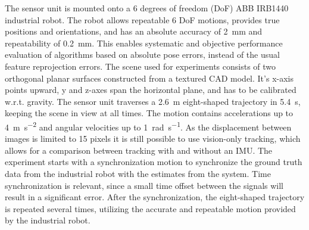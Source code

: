 The sensor unit is mounted onto a 6 degrees of freedom (DoF) ABB IRB1440 industrial robot. The robot allows repeatable 6 DoF motions, provides true positions and orientations, and has an absolute accuracy of \SI{2}{\mm} and repeatability of \SI{0.2}{\mm}. This enables systematic and objective performance evaluation of algorithms based on absolute pose errors, instead of the usual feature reprojection errors. The scene used for experiments consists of two orthogonal planar surfaces constructed from a textured CAD model. It's x-axis points upward, y and z-axes span the horizontal plane, and has to be calibrated w.r.t. gravity. The sensor unit traverses a \SI{2.6}{\m} eight-shaped trajectory in \SI{5.4}{\s}, keeping the scene in view at all times. The motion contains accelerations up to \SI{4}{\m\per\s\squared} and angular velocities up to \SI{1}{\radian\per\s}. As the displacement between images is limited to 15 pixels it is still possible to use vision-only tracking, which allows for a comparison between tracking with and without an IMU. The experiment starts with a synchronization motion to synchronize the ground truth data from the industrial robot with the estimates from the system. Time synchronization is relevant, since a small time offset between the signals will result in a significant error. After the synchronization, the eight-shaped trajectory is repeated several times, utilizing the accurate and repeatable motion provided by the industrial robot.













